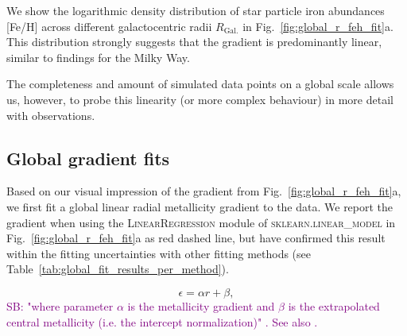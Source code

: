 \documentclass[fleqn,usenatbib]{mnras}
\newcommand{\SB}[1]{{\textcolor{purple}{SB: #1}}}
\begin{document}
We show the logarithmic density distribution of star particle iron abundances [Fe/H] across different galactocentric radii $R_\mathrm{Gal.}$ in Fig.~\ref{fig:global_r_feh_fit}a. This distribution strongly suggests that the gradient is predominantly linear, similar to findings for the Milky Way.

The completeness and amount of simulated data points on a global scale allows us, however, to probe this linearity (or more complex behaviour) in more detail with observations.

\subsection{Global gradient fits}



Based on our visual impression of the gradient from Fig.~\ref{fig:global_r_feh_fit}a, we first fit a global linear radial metallicity gradient to the data. We report the gradient when using the \textsc{LinearRegression} module of \textsc{sklearn.linear\_model} \citep{scikit-learn} in Fig.~\ref{fig:global_r_feh_fit}a as red dashed line, but have confirmed this result within the fitting uncertainties with other fitting methods (see Table~\ref{tab:global_fit_results_per_method}).

\begin{equation}
    \epsilon = \alpha r + \beta,
    \label{eq:fit_eq}
\end{equation}
\SB{"where parameter $\alpha$ is the metallicity gradient and $\beta$ is the extrapolated central metallicity (i.e. the intercept normalization)" \citep{Hemler2021}. See also \citet{Ma2017b}.}
\end{document}
